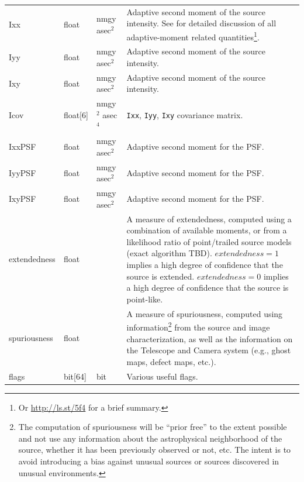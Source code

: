 \documentclass[12pt]{article}
\begin{document}
\begin{center}
\begin{longtable}{p{3cm}p{2cm}p{2cm}p{5cm}}


Ixx & float & nmgy asec$^{2}$  & Adaptive second moment of the source intensity. See \citet{2002AJ....123..583B} for detailed discussion of all adaptive-moment related quantities\footnote{Or \url{http://ls.st/5f4} for a brief summary.}. \\

Iyy & float & nmgy asec$^{2}$ & Adaptive second moment of the source intensity. \\

Ixy & float & nmgy asec$^{2}$ & Adaptive second moment of the source intensity. \\

Icov & float[6] & nmgy$^{2}$ asec$^{4}$ & \texttt{Ixx}, \texttt{Iyy}, \texttt{Ixy} covariance matrix. \\

IxxPSF & float & nmgy asec$^{2}$ & Adaptive second moment for the PSF. \\

IyyPSF & float & nmgy asec$^{2}$ & Adaptive second moment for the PSF. \\

IxyPSF & float & nmgy asec$^{2}$ & Adaptive second moment for the PSF. \\

extendedness & float & ~ & A measure of extendedness, computed using a combination of available moments, or from a likelihood ratio of point/trailed source models (exact algorithm TBD). $extendedness=1$ implies a high degree of confidence that the source is extended. $extendedness=0$ implies a high degree of confidence that the source is point-like. \\

spuriousness & float & ~ & A measure of spuriousness, computed using information\footnote{The computation
of spuriousness will be “prior free” to the extent possible and not use any information about the astrophysical neighborhood of the source, whether it has been previously observed or not, etc. The intent is to avoid introducing
a bias against unusual sources or sources discovered in unusual environments.}
from the source and image characterization, as well as the information on the Telescope and Camera system
(e.g., ghost maps, defect maps, etc.).
\\

flags & bit[64] & bit & Various useful flags.  \\ \hline
\end{longtable}
\end{center}
\end{document}
